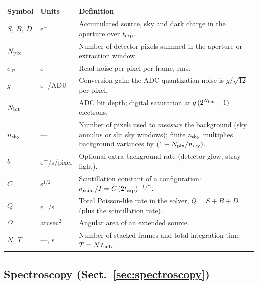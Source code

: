 \begin{tabular}{llp{8.6cm}}
\toprule
Symbol & Units & Definition \\
\midrule
$S,\ B,\ D$ & e$^-$ & Accumulated source, sky and dark charge in the
  aperture over $t_{\rm exp}$. \\
$N_{\rm pix}$ & — & Number of detector pixels summed in the aperture or
  extraction window. \\
$\sigma_R$ & e$^-$ & Read noise per pixel per frame, rms. \\
$g$ & e$^-$/ADU & Conversion gain; the ADC quantization noise is
  $g/\sqrt{12}$ per pixel. \\
$N_{\rm bit}$ & — & ADC bit depth; digital saturation at
  $g\,(2^{N_{\rm bit}}-1)$ electrons. \\
$n_{\rm sky}$ & — & Number of pixels used to \emph{measure} the
  background (sky annulus or slit sky windows); finite $n_{\rm sky}$
  multiplies background variances by $(1 + N_{\rm pix}/n_{\rm sky})$. \\
$\dot b$ & \si{e^-/s}/pixel & Optional extra background rate (detector
  glow, stray light). \\
$C$ & s$^{1/2}$ & Scintillation constant of a configuration:
  $\sigma_{\rm scint}/I = C\,(2 t_{\rm exp})^{-1/2}$. \\
$Q$ & \si{e^-/s} & Total Poisson-like rate in the solver,
  $Q = \dot S + \dot B + \dot D$ (plus the scintillation rate). \\
$\Omega$ & arcsec$^2$ & Angular area of an extended source. \\
$N,\ T$ & —, s & Number of stacked frames and total integration time
  $T = N\,t_{\rm sub}$. \\
\bottomrule
\end{tabular}

\subsection*{Spectroscopy (Sect.~\ref{sec:spectroscopy})}

